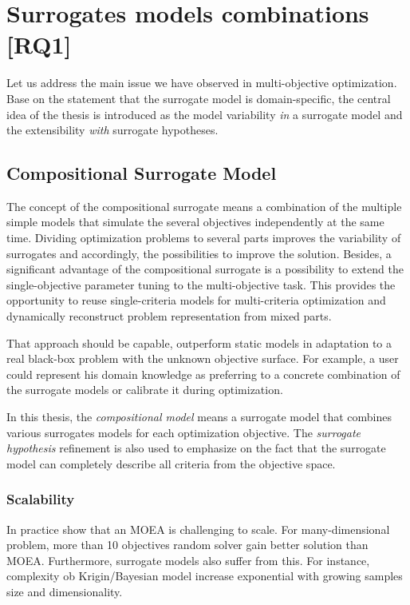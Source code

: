     \section{Surrogates models combinations [RQ1]}

        Let us address the main issue we have observed in multi-objective optimization. Base on the statement that the surrogate model is domain-specific, the central idea of the thesis is introduced as the model variability \emph{in} a surrogate model and the extensibility \emph{with} surrogate hypotheses.

        \subsection{Compositional Surrogate Model}
            The concept of the compositional surrogate means a combination of the multiple simple models that simulate the several objectives independently at the same time. Dividing optimization problems to several parts improves the variability of surrogates and accordingly, the possibilities to improve the solution.
            Besides, a significant advantage of the compositional surrogate is a possibility to extend the single-objective parameter tuning to the multi-objective task. This provides the opportunity to reuse single-criteria models for multi-criteria optimization and dynamically reconstruct problem representation from mixed parts.
            

            That approach should be capable, outperform static models in adaptation to a real black-box problem with the unknown objective surface. For example, a user could represent his domain knowledge as preferring to a concrete combination of the surrogate models or calibrate it during optimization. 
            
            In this thesis, the \emph{compositional model} means a surrogate model that combines various surrogates models for each optimization objective. The \emph{surrogate hypothesis} refinement is also used to emphasize on the fact that the surrogate model can completely describe all criteria from the objective space.

            \subsubsection{Scalability}
                In practice show that an MOEA is challenging to scale. For many-dimensional problem, more than 10 objectives random solver gain better solution than MOEA. Furthermore, surrogate models also suffer from this. For instance, complexity ob Krigin/Bayesian model increase exponential with growing samples size and dimensionality.

